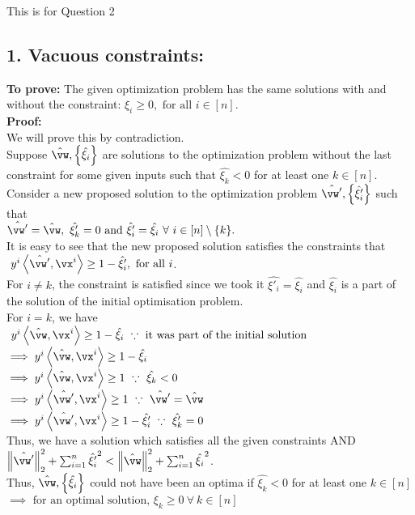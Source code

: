 \documentclass[a4paper,11pt]{article}
\begin{document}
\begin{mlsolution}
This is for Question 2

\end{mlsolution}

\begin{mlsolution}
\section*{1. Vacuous constraints:}
\textbf{To prove:} The given optimization problem has the same solutions with and without the constraint:
$\xi_i \geq 0, \text{ for all } i \in [n]$.\newline
\\\textbf{Proof:}
\\We will prove this by contradiction.
\\ Suppose $\hat{\vw},\bc{\hat{\xi_i}}$ are solutions to the optimization problem without the last constraint for some given inputs such that $\hat{\xi_k} < 0$ for at least one $k \in [n]$.
\\ Consider a new proposed solution to the optimization problem $\hat{\vw'},\bc{\hat{\xi'_i}}$ such that 
\\$\hat{\vw'} = \hat{\vw},\  \hat{\xi'_k} = 0 \text{ and } \hat{\xi'_i} = \hat{\xi_i}\  \forall\  i \in [n] \setminus \{k\}.$\newline
\\It is easy to see that the new proposed solution satisfies the constraints that
\\ $\ y^i\ip{\hat{\vw'}}{\vx^i} \geq 1 - \hat{\xi'_i}, \text{ for all } i$. 
\\For $i \neq k$, the constraint is satisfied since we took it $\hat{\xi'_i} = \hat{\xi_i}$ and $\hat{\xi_i}$ is a part of the solution of the initial optimisation problem.
\\For $i = k$, we have 
\\ $\ y^i\ip{\hat{\vw}}{\vx^i} \geq 1 - \hat{\xi_i}\  \because\ \text{it was part of the initial solution} $
\\$\implies y^i\ip{\hat{\vw}}{\vx^i} \geq 1 - \hat{\xi_i}\ $
\\$\implies y^i\ip{\hat{\vw}}{\vx^i} \geq 1\ \because\ \hat{\xi_k} < 0\ $
\\$\implies y^i\ip{\hat{\vw'}}{\vx^i} \geq 1\ \because\  \hat{\vw'} = \hat{\vw} $
\\$\implies y^i\ip{\hat{\vw'}}{\vx^i} \geq 1 - \hat{\xi'_i}\ \because\  \hat{\xi'_k} = 0 $\newline
\\Thus, we have a solution which satisfies all the given constraints AND
\\$\norm{\hat{\vw'}}_2^2 + \sum_{i=1}^n\hat{\xi'_i}^2 < \norm{\hat{\vw}}_2^2 + \sum_{i=1}^n\hat{\xi_i}^2 $.
\\Thus, $\hat{\vw},\bc{\hat{\xi_i}}$ could not have been an optima if $\hat{\xi_k} < 0$ for at least one $k \in [n]$
\\$\implies \text{ for an optimal solution, } \xi_k \geq 0\  \forall\  k \in [n]$


\end{mlsolution}
\end{document}

